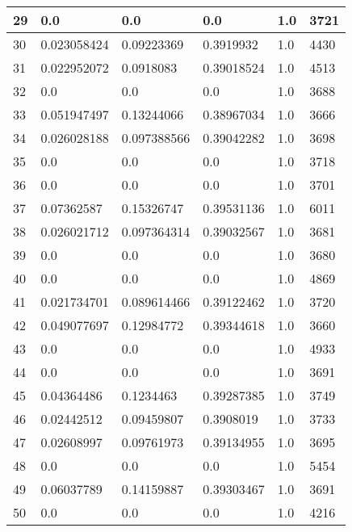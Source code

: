 \begin{longtable}{|l|l|l|l|l|l|}
29 & 0.0 & 0.0 & 0.0 & 1.0 & 3721 \\ \hline 
30 & 0.023058424 & 0.09223369 & 0.3919932 & 1.0 & 4430 \\ \hline 
31 & 0.022952072 & 0.0918083 & 0.39018524 & 1.0 & 4513 \\ \hline 
32 & 0.0 & 0.0 & 0.0 & 1.0 & 3688 \\ \hline 
33 & 0.051947497 & 0.13244066 & 0.38967034 & 1.0 & 3666 \\ \hline 
34 & 0.026028188 & 0.097388566 & 0.39042282 & 1.0 & 3698 \\ \hline 
35 & 0.0 & 0.0 & 0.0 & 1.0 & 3718 \\ \hline 
36 & 0.0 & 0.0 & 0.0 & 1.0 & 3701 \\ \hline 
37 & 0.07362587 & 0.15326747 & 0.39531136 & 1.0 & 6011 \\ \hline 
38 & 0.026021712 & 0.097364314 & 0.39032567 & 1.0 & 3681 \\ \hline 
39 & 0.0 & 0.0 & 0.0 & 1.0 & 3680 \\ \hline 
40 & 0.0 & 0.0 & 0.0 & 1.0 & 4869 \\ \hline 
41 & 0.021734701 & 0.089614466 & 0.39122462 & 1.0 & 3720 \\ \hline 
42 & 0.049077697 & 0.12984772 & 0.39344618 & 1.0 & 3660 \\ \hline 
43 & 0.0 & 0.0 & 0.0 & 1.0 & 4933 \\ \hline 
44 & 0.0 & 0.0 & 0.0 & 1.0 & 3691 \\ \hline 
45 & 0.04364486 & 0.1234463 & 0.39287385 & 1.0 & 3749 \\ \hline 
46 & 0.02442512 & 0.09459807 & 0.3908019 & 1.0 & 3733 \\ \hline 
47 & 0.02608997 & 0.09761973 & 0.39134955 & 1.0 & 3695 \\ \hline 
48 & 0.0 & 0.0 & 0.0 & 1.0 & 5454 \\ \hline 
49 & 0.06037789 & 0.14159887 & 0.39303467 & 1.0 & 3691 \\ \hline 
50 & 0.0 & 0.0 & 0.0 & 1.0 & 4216 \\ \hline 
\end{longtable}